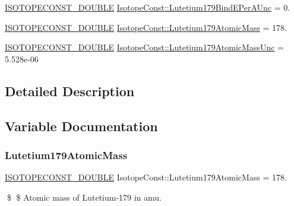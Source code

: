\begin{DoxyCompactItemize}
\mbox{\hyperlink{group___isotope_const-_macros_ga8f45a7272ce02c0b4c65c44636ed719a}{I\+S\+O\+T\+O\+P\+E\+C\+O\+N\+S\+T\+\_\+\+D\+O\+U\+B\+LE}} \mbox{\hyperlink{group___isotope_const-_lutetium-_lu179_gaabbc632f56737bf2042f3bd681065949}{Isotope\+Const\+::\+Lutetium179\+Bind\+E\+Per\+A\+Unc}} = 0.
\item 
\mbox{\hyperlink{group___isotope_const-_macros_ga8f45a7272ce02c0b4c65c44636ed719a}{I\+S\+O\+T\+O\+P\+E\+C\+O\+N\+S\+T\+\_\+\+D\+O\+U\+B\+LE}} \mbox{\hyperlink{group___isotope_const-_lutetium-_lu179_gab2113c15fcc8cce9d2517cf6688ad0d9}{Isotope\+Const\+::\+Lutetium179\+Atomic\+Mass}} = 178.
\item 
\mbox{\hyperlink{group___isotope_const-_macros_ga8f45a7272ce02c0b4c65c44636ed719a}{I\+S\+O\+T\+O\+P\+E\+C\+O\+N\+S\+T\+\_\+\+D\+O\+U\+B\+LE}} \mbox{\hyperlink{group___isotope_const-_lutetium-_lu179_gaea3da05214cf74198f427da82b9ef34c}{Isotope\+Const\+::\+Lutetium179\+Atomic\+Mass\+Unc}} = 5.\+528e-\/06
\end{DoxyCompactItemize}


\subsection{Detailed Description}


\subsection{Variable Documentation}
\mbox{\label{group___isotope_const-_lutetium-_lu179_gab2113c15fcc8cce9d2517cf6688ad0d9}} 
\subsubsection{\texorpdfstring{Lutetium179\+Atomic\+Mass}{Lutetium179AtomicMass}}
{\footnotesize\ttfamily \mbox{\hyperlink{group___isotope_const-_macros_ga8f45a7272ce02c0b4c65c44636ed719a}{I\+S\+O\+T\+O\+P\+E\+C\+O\+N\+S\+T\+\_\+\+D\+O\+U\+B\+LE}} Isotope\+Const\+::\+Lutetium179\+Atomic\+Mass = 178.}

\$ \$ Atomic mass of Lutetium-\/179 in amu. \mbox{\label{group___isotope_const-_lutetium-_lu179_gaea3da05214cf74198f427da82b9ef34c}} 
